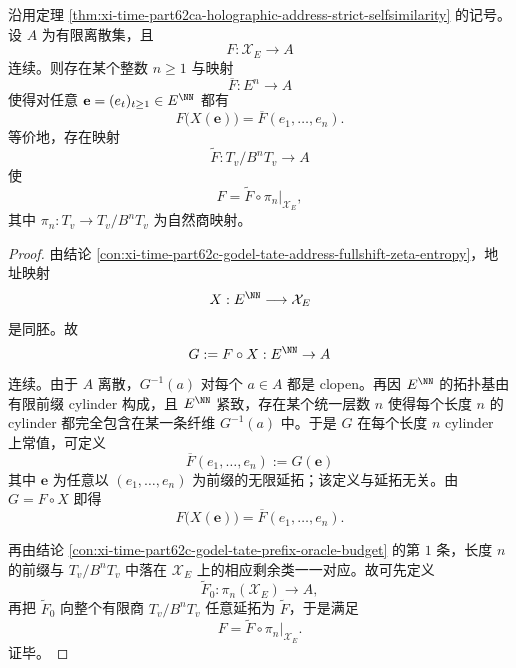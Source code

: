 \begin{corollary}[任意有限值连续观测都因子化于有限前缀]\label{cor:xi-time-part62ca-finite-valued-continuous-observables-prefix-factorization}
沿用定理 \ref{thm:xi-time-part62ca-holographic-address-strict-selfsimilarity} 的记号。设 \(A\) 为有限离散集，且
\[
F:\mathcal X_E\to A
\]
连续。则存在某个整数 \(n\ge 1\) 与映射
\[
\overline F:E^n\to A
\]
使得对任意 \(\mathbf e=(e_t)_{t\ge 1}\in E^{\NN}\) 都有
\[
F\!\bigl(X(\mathbf e)\bigr)=\overline F(e_1,\dots,e_n).
\]
等价地，存在映射
\[
\widetilde F:T_v/B^nT_v\to A
\]
使
\[
F=\widetilde F\circ \pi_n|_{\mathcal X_E},
\]
其中 \(\pi_n:T_v\to T_v/B^nT_v\) 为自然商映射。
\end{corollary}
\begin{proof}
由结论 \ref{con:xi-time-part62c-godel-tate-address-fullshift-zeta-entropy}，地址映射
\[
X:E^{\NN}\longrightarrow \mathcal X_E
\]
是同胚。故
\[
G:=F\circ X:E^{\NN}\to A
\]
连续。由于 \(A\) 离散，\(G^{-1}(a)\) 对每个 \(a\in A\) 都是 clopen。再因 \(E^{\NN}\) 的拓扑基由有限前缀 cylinder 构成，且 \(E^{\NN}\) 紧致，存在某个统一层数 \(n\) 使得每个长度 \(n\) 的 cylinder 都完全包含在某一条纤维 \(G^{-1}(a)\) 中。于是 \(G\) 在每个长度 \(n\) cylinder 上常值，可定义
\[
\overline F(e_1,\dots,e_n):=G(\mathbf e)
\]
其中 \(\mathbf e\) 为任意以 \((e_1,\dots,e_n)\) 为前缀的无限延拓；该定义与延拓无关。由 \(G=F\circ X\) 即得
\[
F\!\bigl(X(\mathbf e)\bigr)=\overline F(e_1,\dots,e_n).
\]

再由结论 \ref{con:xi-time-part62c-godel-tate-prefix-oracle-budget} 的第 \(1\) 条，长度 \(n\) 的前缀与 \(T_v/B^nT_v\) 中落在 \(\mathcal X_E\) 上的相应剩余类一一对应。故可先定义
\[
\widetilde F_0:\pi_n(\mathcal X_E)\to A,
\]
再把 \(\widetilde F_0\) 向整个有限商 \(T_v/B^nT_v\) 任意延拓为 \(\widetilde F\)，于是满足
\[
F=\widetilde F\circ \pi_n|_{\mathcal X_E}.
\]
证毕。
\end{proof}

